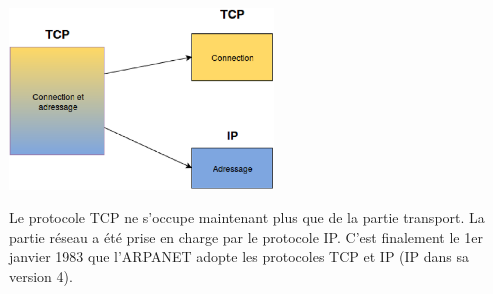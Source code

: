 \begin{center}
\includegraphics[width=7cm]{./pics/tcp2ip.eps}
\end{center}

Le protocole TCP ne s'occupe maintenant plus que de la partie transport. La
partie réseau a été prise en charge par le protocole IP.  C'est finalement le
1er janvier 1983 que l'ARPANET adopte les protocoles TCP et IP (IP dans sa version 4). 
